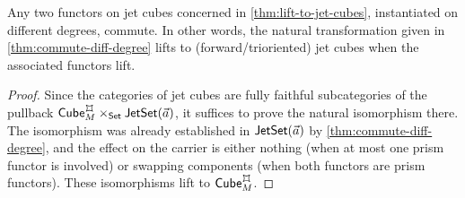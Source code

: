 \documentclass[a4paper]{memoir}
\begin{document}
%	
\begin{proposition} \label{thm:cube-commute-diff-degree}
	Any two functors on jet cubes concerned in \cref{thm:lift-to-jet-cubes}, instantiated on different degrees, commute.
	In other words, the natural transformation given in \cref{thm:commute-diff-degree} lifts to (forward/trioriented) jet cubes when the associated functors lift.
\end{proposition}
\begin{proof}
	Since the categories of jet cubes are fully faithful subcategories of the pullback $\cubecat_M^\mycubex \times_\Set \jetset{\vec a}$, it suffices to prove the natural isomorphism there.
	The isomorphism was already established in $\mathsf{JetSet}(\vec a)$ by \cref{thm:commute-diff-degree}, and the effect on the carrier is either nothing (when at most one prism functor is involved) or swapping components (when both functors are prism functors).
	These isomorphisms lift to $\cubecat_M^\mycubex$.
\end{proof}
\end{document}
